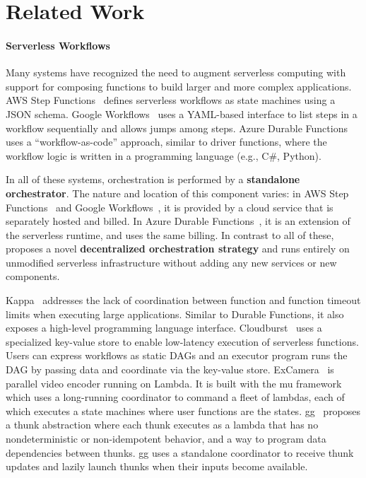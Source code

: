 \section{Related Work}\label{sec:related}

\paragraph{Serverless Workflows}

Many systems have recognized the need to augment serverless computing with
support for composing functions to build larger and more complex applications.
AWS Step Functions~\cite{aws-step-functions} defines serverless workflows as
state machines using a JSON schema. Google Workflows~\cite{google-workflows}
uses a YAML-based interface to list steps in a workflow sequentially and
allows jumps among steps. Azure Durable Functions~\cite{durable-functions}
uses a ``workflow-as-code'' approach, similar to driver functions, where the
workflow logic is written in a programming language (e.g., C\#, Python).

In all of these systems, orchestration is performed by a \textbf {standalone
orchestrator}. The nature and location of this component varies: in AWS Step
Functions~\cite{aws-step-functions} and Google Workflows~\cite
{google-workflows}, it is provided by a cloud service that is separately
hosted and billed. In Azure Durable Functions~\cite{durable-functions}, it is
an extension of the serverless runtime, and uses the same billing. In contrast
to all of these, \name{} proposes a novel \textbf{decentralized orchestration
strategy} and runs entirely on unmodified serverless infrastructure without
adding any new services or new components.

Kappa~\cite{kappa} addresses the lack of coordination between function and
function timeout limits when executing large applications. Similar to Durable
Functions, it also exposes a high-level programming language interface.
Cloudburst~\cite{cloudburst} uses a specialized key-value store to enable
low-latency execution of serverless functions. Users can express workflows as
static DAGs and an executor program runs the DAG by passing data and
coordinate via the key-value store. ExCamera~\cite{excamera} is parallel video
encoder running on Lambda. It is built with the mu framework which uses a
long-running coordinator to command a fleet of lambdas, each of which executes
a state machines where user functions are the states. gg~\cite{gg-atc}
proposes a thunk abstraction where each thunk executes as a lambda that has no
nondeterministic or non-idempotent behavior, and a way to program data
dependencies between thunks. gg uses a standalone coordinator to receive thunk
updates and lazily launch thunks when their inputs become available.

